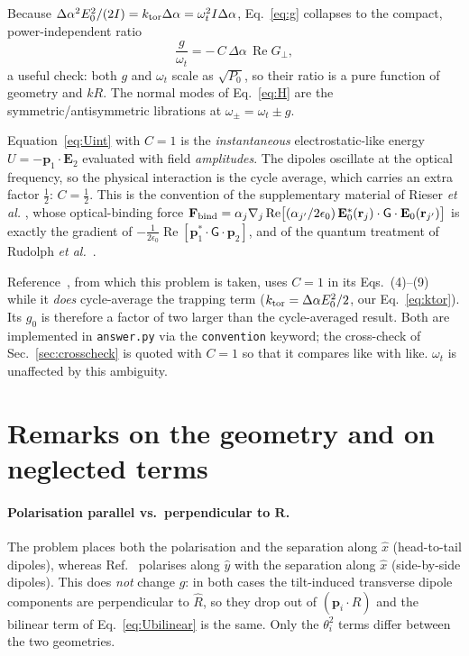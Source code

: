 \documentclass[11pt,a4paper]{article}
\newcommand{\dalpha}{\Delta\alpha}
\newcommand{\ReG}{\operatorname{Re}G_{\perp}}
\begin{document}
\noindent
Because $\dalpha^{2}E_0^{2}/(2I)=k_{\rm tor}\dalpha=\omega_t^{2}I\dalpha$,
Eq.~\eqref{eq:g} collapses to the compact, power-independent ratio
\begin{equation}
  \frac{g}{\omega_t}=-\,C\,\dalpha\,\ReG ,
  \label{eq:ratio}
\end{equation}
a useful check: both $g$ and $\omega_t$ scale as $\sqrt{P_0}$, so their ratio is
a pure function of geometry and $kR$.  The normal modes of Eq.~\eqref{eq:H} are
the symmetric/antisymmetric librations at $\omega_{\pm}=\omega_t\pm g$.

\begin{tcolorbox}[colback=red!5,colframe=red!55!black,
  title=\textbf{FLAG --- the factor of two in $g$}]
Equation~\eqref{eq:Uint} with $C=1$ is the \emph{instantaneous} electrostatic-like
energy $U=-\mathbf p_1\cdot\mathbf E_2$ evaluated with field \emph{amplitudes}.
The dipoles oscillate at the optical frequency, so the physical interaction is the
cycle average, which carries an extra factor $\tfrac12$: $C=\tfrac12$.  This is
the convention of the supplementary material of Rieser \emph{et al.}
\cite{Rieser2022}, whose optical-binding force
$\mathbf F_{\rm bind}=\alpha_j\nabla_j\operatorname{Re}
\bigl[(\alpha_{j'}/2\epsilon_0)\,\mathbf E_0^{*}(\mathbf r_j)\cdot
\mathsf G\cdot\mathbf E_0(\mathbf r_{j'})\bigr]$
is exactly the gradient of $-\tfrac{1}{2\epsilon_0}
\operatorname{Re}[\mathbf p_1^{*}\!\cdot\!\mathsf G\!\cdot\!\mathbf p_2]$, and of
the quantum treatment of Rudolph \emph{et al.}~\cite{Rudolph2024,Rudolph2024b}.

Reference~\cite{Zhang2025}, from which this problem is taken, uses $C=1$ in its
Eqs.~(4)--(9) while it \emph{does} cycle-average the trapping term
($k_{\rm tor}=\dalpha E_0^{2}/2$, our Eq.~\eqref{eq:ktor}).  Its $g_0$ is
therefore a factor of two larger than the cycle-averaged result.  Both are
implemented in \texttt{answer.py} via the \texttt{convention} keyword; the
cross-check of Sec.~\ref{sec:crosscheck} is quoted with $C=1$ so that it compares
like with like.  $\omega_t$ is unaffected by this ambiguity.
\end{tcolorbox}

\section{Remarks on the geometry and on neglected terms}
\label{sec:geometry}

\paragraph{Polarisation parallel vs.\ perpendicular to $\mathbf R$.}
The problem places both the polarisation and the separation along $\hat x$
(head-to-tail dipoles), whereas Ref.~\cite{Zhang2025} polarises along $\hat y$
with the separation along $\hat x$ (side-by-side dipoles).  This does \emph{not}
change $g$: in both cases the tilt-induced transverse dipole components are
perpendicular to $\hat R$, so they drop out of $(\mathbf p_i\cdot\hat R)$ and the
bilinear term of Eq.~\eqref{eq:Ubilinear} is the same.  Only the
$\theta_i^{2}$ terms differ between the two geometries.
\end{document}
